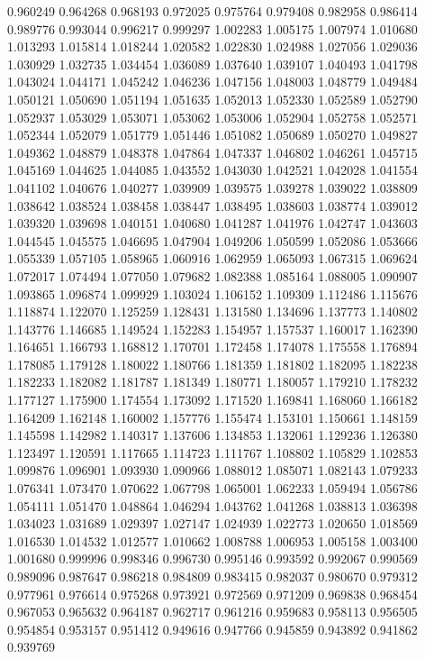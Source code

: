 0.960249
0.964268
0.968193
0.972025
0.975764
0.979408
0.982958
0.986414
0.989776
0.993044
0.996217
0.999297
1.002283
1.005175
1.007974
1.010680
1.013293
1.015814
1.018244
1.020582
1.022830
1.024988
1.027056
1.029036
1.030929
1.032735
1.034454
1.036089
1.037640
1.039107
1.040493
1.041798
1.043024
1.044171
1.045242
1.046236
1.047156
1.048003
1.048779
1.049484
1.050121
1.050690
1.051194
1.051635
1.052013
1.052330
1.052589
1.052790
1.052937
1.053029
1.053071
1.053062
1.053006
1.052904
1.052758
1.052571
1.052344
1.052079
1.051779
1.051446
1.051082
1.050689
1.050270
1.049827
1.049362
1.048879
1.048378
1.047864
1.047337
1.046802
1.046261
1.045715
1.045169
1.044625
1.044085
1.043552
1.043030
1.042521
1.042028
1.041554
1.041102
1.040676
1.040277
1.039909
1.039575
1.039278
1.039022
1.038809
1.038642
1.038524
1.038458
1.038447
1.038495
1.038603
1.038774
1.039012
1.039320
1.039698
1.040151
1.040680
1.041287
1.041976
1.042747
1.043603
1.044545
1.045575
1.046695
1.047904
1.049206
1.050599
1.052086
1.053666
1.055339
1.057105
1.058965
1.060916
1.062959
1.065093
1.067315
1.069624
1.072017
1.074494
1.077050
1.079682
1.082388
1.085164
1.088005
1.090907
1.093865
1.096874
1.099929
1.103024
1.106152
1.109309
1.112486
1.115676
1.118874
1.122070
1.125259
1.128431
1.131580
1.134696
1.137773
1.140802
1.143776
1.146685
1.149524
1.152283
1.154957
1.157537
1.160017
1.162390
1.164651
1.166793
1.168812
1.170701
1.172458
1.174078
1.175558
1.176894
1.178085
1.179128
1.180022
1.180766
1.181359
1.181802
1.182095
1.182238
1.182233
1.182082
1.181787
1.181349
1.180771
1.180057
1.179210
1.178232
1.177127
1.175900
1.174554
1.173092
1.171520
1.169841
1.168060
1.166182
1.164209
1.162148
1.160002
1.157776
1.155474
1.153101
1.150661
1.148159
1.145598
1.142982
1.140317
1.137606
1.134853
1.132061
1.129236
1.126380
1.123497
1.120591
1.117665
1.114723
1.111767
1.108802
1.105829
1.102853
1.099876
1.096901
1.093930
1.090966
1.088012
1.085071
1.082143
1.079233
1.076341
1.073470
1.070622
1.067798
1.065001
1.062233
1.059494
1.056786
1.054111
1.051470
1.048864
1.046294
1.043762
1.041268
1.038813
1.036398
1.034023
1.031689
1.029397
1.027147
1.024939
1.022773
1.020650
1.018569
1.016530
1.014532
1.012577
1.010662
1.008788
1.006953
1.005158
1.003400
1.001680
0.999996
0.998346
0.996730
0.995146
0.993592
0.992067
0.990569
0.989096
0.987647
0.986218
0.984809
0.983415
0.982037
0.980670
0.979312
0.977961
0.976614
0.975268
0.973921
0.972569
0.971209
0.969838
0.968454
0.967053
0.965632
0.964187
0.962717
0.961216
0.959683
0.958113
0.956505
0.954854
0.953157
0.951412
0.949616
0.947766
0.945859
0.943892
0.941862
0.939769
